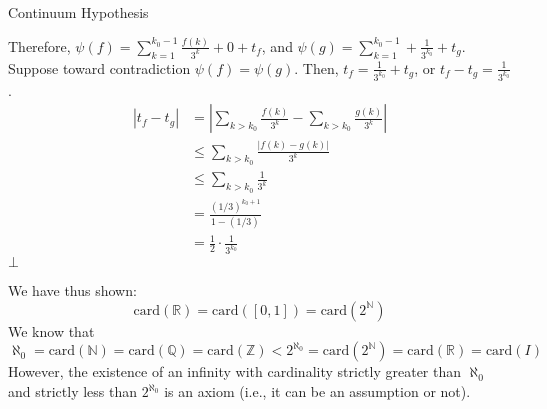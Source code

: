 \documentclass[8pt]{extarticle}
\newcommand{\card}{\text{card}}
\newcommand{\N}{\mathbb{N}}
\newcommand{\Q}{\mathbb{Q}}
\newcommand{\Z}{\mathbb{Z}}
\newcommand{\R}{\mathbb{R}}
\begin{document}
\begin{problem}{Continuum Hypothesis}
\begin{description}
          Therefore, $\psi(f) = \sum_{k = 1}^{k_0-1}\frac{f(k)}{3^k} + 0 + t_f$, and $\psi(g) = \sum_{k=1}^{k_0-1} + \frac{1}{3^{k_0}} + t_g$.\\

          Suppose toward contradiction $\psi(f) = \psi(g)$. Then, $t_f = \frac{1}{3^{k_0}} + t_g$, or $t_f - t_g = \frac{1}{3^{k_0}}$.
          \begin{align*}
            |t_f-t_g| &= |\sum_{k>k_0}\frac{f(k)}{3^k} - \sum_{k>k_0}\frac{g(k)}{3^k}|\\
                      &\leq \sum_{k>k_0}\frac{|f(k)-g(k)|}{3^k}\\
                      &\leq \sum_{k>k_0}\frac{1}{3^{k}}\\
                      &= \frac{(1/3)^{k_0+1}}{1-(1/3)}\\
                      &= \frac{1}{2}\cdot\frac{1}{3^{k_0}}
          \end{align*}
          $\bot$
    \end{description}
    We have thus shown:
    \[
      \card(\R) = \card([0,1]) = \card(2^{\N})
    \] 
    We know that \[\aleph_0 = \card(\N) = \card(\Q) = \card(\Z) < 2^{\aleph_0} = \card(2^{\N}) = \card(\R) = \card(I)\] However, the existence of an infinity with cardinality strictly greater than $\aleph_0$ and strictly less than $2^{\aleph_0}$ is an axiom (i.e., it can be an assumption or not).
  \end{problem}
\end{document}
